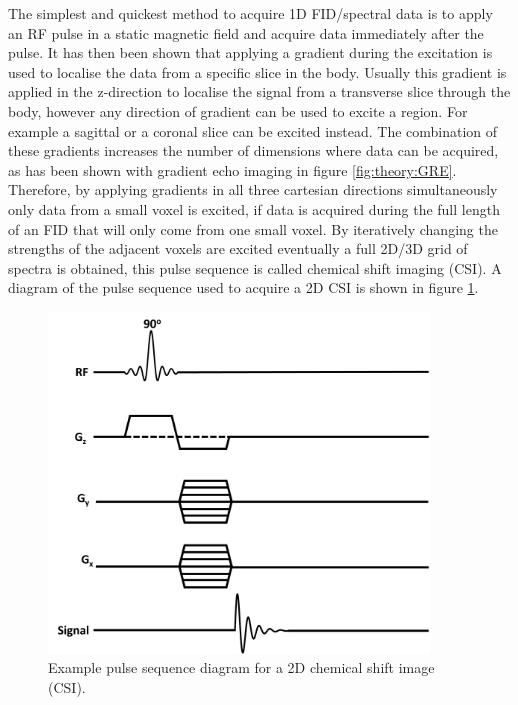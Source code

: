 \documentclass[class=article, crop=false]{standalone}
\begin{document}
The simplest and quickest method to acquire 1D FID/spectral data is to apply an RF pulse in a static magnetic field and acquire data immediately after the pulse. It has then been shown that applying a gradient during the excitation is used to localise the data from a specific slice in the body. Usually this gradient is applied in the z-direction to localise the signal from a transverse slice through the body, however any direction of gradient can be used to excite a region. For example a sagittal or a coronal slice can be excited instead. The combination of these gradients increases the number of dimensions where data can be acquired, as has been shown with gradient echo imaging in figure \ref{fig:theory:GRE}. Therefore, by applying gradients in all three cartesian directions simultaneously only data from a small voxel is excited, if data is acquired during the full length of an FID that will only come from one small voxel. By iteratively changing the strengths of the adjacent voxels are excited eventually a full 2D/3D grid of spectra is obtained, this pulse sequence is called chemical shift imaging (CSI). A diagram of the pulse sequence used to acquire a 2D CSI is shown in figure \ref{fig:theory:CSI}.

\begin{figure}
    \centering
    \includegraphics[width=0.9\textwidth]{Figures/Theory/CSI_sequence.png}
    \caption{Example pulse sequence diagram for a 2D chemical shift image (CSI).}
    \label{fig:theory:CSI}
\end{figure}
\end{document}
